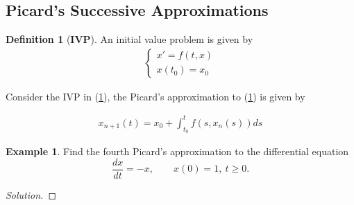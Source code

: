 \documentclass[leqno,DIV=calc,paper=a4,fontsize=11pt]{article}
\theoremstyle{definition}
\newtheorem{defn}[thm]{Definition}
\newtheorem{exmp}[thm]{Example}
\theoremstyle{plain}
\theoremstyle{remark}
\begin{document}
\subsection{Picard's Successive Approximations}

\begin{defn}[\textbf{IVP}] \label{ivp}An initial value problem is given by
\begin{align}\label{ivp}
\begin{cases}
x'=f(t,x)\\
x(t_0)=x_0
\end{cases}
\end{align}
\end{defn}

Consider the IVP in (\ref{ivp}), the Picard's approximation to (\ref{ivp}) is given by

\begin{align}
x_{n+1}(t)=x_0+\int_{t_0}^{t}f(s,x_{n}(s))ds
\end{align}

\begin{exmp}
Find the fourth Picard's approximation to the differential equation
\[\frac{dx}{dt}=-x, \qquad x(0)=1, \ t\geq0.\]
\begin{proof}[Solution]

\end{proof}
\end{exmp}
\end{document}
